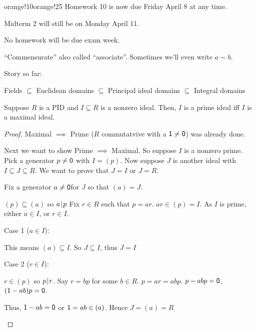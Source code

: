 \documentclass[notes.tex]{subfiles}
\begin{document}
\begin{classnote}{orange!10}{orange!25}
	Homework 10 is now due Friday April 8 at any time.

	Midterm 2 will still be on Monday April 11.

	No homework will be due exam week.
\end{classnote}

\begin{remark}
	``Commensurate'' also called ``associate''.
	Sometimes we'll even write $a\sim b$.
\end{remark}

Story so far: 
\begin{center}
	Fields $\subseteq$ Euclidean domains $\subseteq$ Principal ideal domains $\subseteq$ Integral domains %
\end{center}

\begin{proposition}
	Suppose $R$ is a PID and $I\subseteq R$ is a nonzero ideal. Then, $I$ is a prime ideal iff $I$ is a maximal ideal.
\end{proposition}

\begin{proof}
	Maximal $\implies$ Prime ($R$ commutatvive with a $\mathsf{1}\ne\mathsf{0}$) was already done. 
 
	Next we want to show Prime $\implies$ Maximal.
	So suppose $I$ is a nonzero prime. Pick a generator $p\ne\mathsf{0}$ with $I = (p)$. Now suppose $J$ is another ideal with $I\subseteq J \subseteq R$. We want to prove that $J=I$ or $J=R$.

	Fix a generator $a\ne\mathsf{0}$for $J$ so that $(a) = J$.

	$(p)\subseteq (a)$ so $a\mkern2mu|\mkern1mu p$ Fix $r\in R$ such that $p = ar$. 
	$ar\in (p) = I$. As $I$ is prime, either $a\in I$, or $r\in I$.

	Case 1 ($a\in I$):
	\begin{tabin}
		This means $(a) \subseteq I$. So $J\subseteq I$, thus $J=I$
	\end{tabin}

	Case 2 ($r\in I$):
	\begin{tabin}
		$r\in (p)$ so $p\mkern2mu|\mkern1mu r$.
		Say $r=bp$ for some $b\in R$.
		$p=ar=abp$.
		$p-abp = \mathsf{0}$, $(\mathsf{1}-ab)p=\mathsf{0}$.

		Thus, $\mathsf{1}-ab = \mathsf{0}$ or $\mathsf{1} = ab \in (a)$. Hence $J = (a) = R$
	\end{tabin}
\end{proof}
\end{document}
